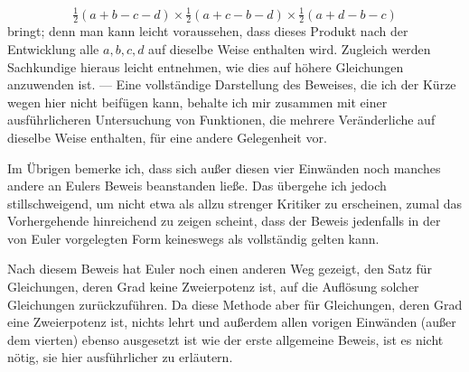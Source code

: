 \[
\tfrac12(a+b-c-d)\times\tfrac12(a+c-b-d)\times\tfrac12(a+d-b-c)
\]
bringt; denn man kann leicht voraussehen, dass dieses Produkt nach der Entwicklung alle $a,b,c,d$ auf dieselbe Weise enthalten wird. Zugleich werden Sachkundige hieraus leicht entnehmen, wie dies auf höhere Gleichungen anzuwenden ist. --- Eine vollständige Darstellung des Beweises, die ich der Kürze wegen hier nicht beifügen kann, behalte ich mir zusammen mit einer ausführlicheren Untersuchung von Funktionen, die mehrere Veränderliche auf dieselbe Weise enthalten, für eine andere Gelegenheit vor.

Im Übrigen bemerke ich, dass sich außer diesen vier Einwänden noch manches andere an Eulers Beweis beanstanden ließe. Das übergehe ich jedoch stillschweigend, um nicht etwa als allzu strenger Kritiker zu erscheinen, zumal das Vorhergehende hinreichend zu zeigen scheint, dass der Beweis jedenfalls in der von Euler vorgelegten Form keineswegs als vollständig gelten kann.

Nach diesem Beweis hat Euler noch einen anderen Weg gezeigt, den Satz für Gleichungen, deren Grad keine Zweierpotenz ist, auf die Auflösung solcher Gleichungen zurückzuführen. Da diese Methode aber für Gleichungen, deren
Grad eine Zweierpotenz ist, nichts lehrt und außerdem allen vorigen Einwänden (außer dem vierten) ebenso ausgesetzt ist wie der erste allgemeine Beweis, ist es nicht nötig, sie hier ausführlicher zu erläutern.
